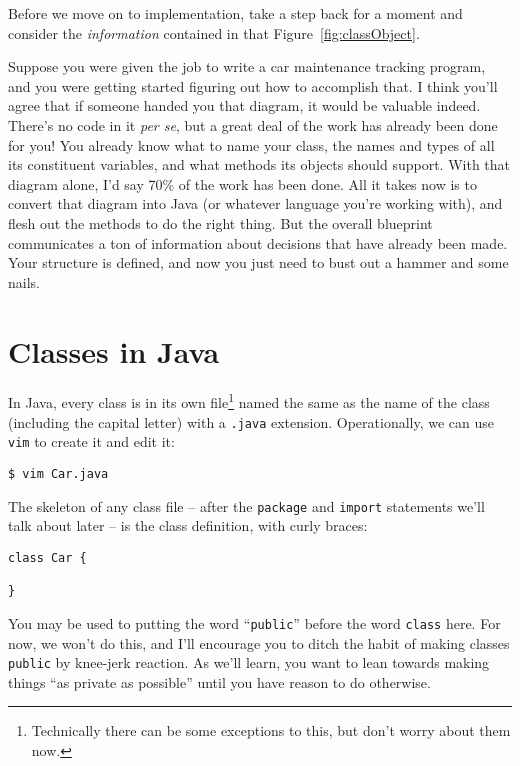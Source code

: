 Before we move on to implementation, take a step back for a moment and
consider the \textit{information} contained in that
Figure~\ref{fig:classObject}.

Suppose you were given the job to write a car maintenance tracking program,
and you were getting started figuring out how to accomplish that. I think
you'll agree that if someone handed you that diagram, it would be valuable
indeed. There's no code in it \textit{per se}, but a great deal of the work
has already been done for you! You already know what to name your class, the
names and types of all its constituent variables, and what methods its objects
should support. With that diagram alone, I'd say 70\% of the work has been
done. All it takes now is to convert that diagram into Java (or whatever
language you're working with), and flesh out the methods to do the right
thing. But the overall blueprint communicates a ton of information about
decisions that have already been made. Your structure is defined, and now you
just need to bust out a hammer and some nails.


\section{Classes in Java}

In Java, every class is in its own file\footnote{Technically there can be
some exceptions to this, but don't worry about them now.} named the same as
the name of the class (including the capital letter) with a \texttt{.java}
extension. Operationally, we can use \texttt{vim} to create it and edit it:

\begin{verbatim}
$ vim Car.java
\end{verbatim}

The skeleton of any class file -- after the \texttt{package} and
\texttt{import} statements we'll talk about later -- is the class definition,
with curly braces:

\begin{Verbatim}[samepage=true,fontsize=\footnotesize,frame=single]
class Car {
    
}
\end{Verbatim}

You may be used to putting the word ``\texttt{public}'' before the word
\texttt{class} here. For now, we won't do this, and I'll encourage you to
ditch the habit of making classes \texttt{public} by knee-jerk reaction. As
we'll learn, you want to lean towards making things ``as private as possible''
until you have reason to do otherwise.


